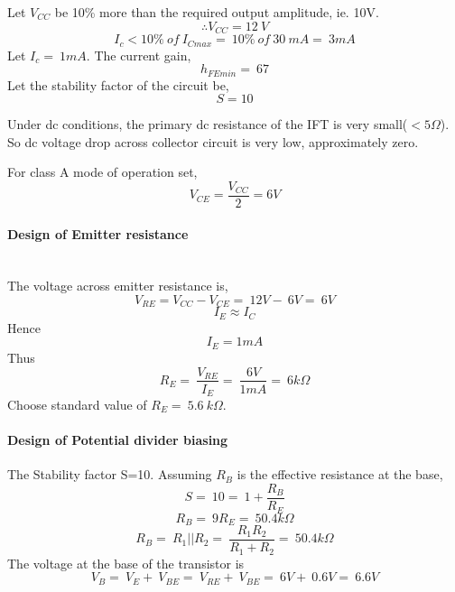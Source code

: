 \noindent Let $V_{CC}$ be 10\% more than the required output amplitude, ie. 10V.
\begin{equation}
\therefore V_{CC}=12\ V
\end{equation}
\begin{equation}
I_c<10 \% \ of \  I_{Cmax} =\ 10\%\  of\  30\  mA =\ 3 mA
\end{equation}
\noindent Let $I_c=\ 1 mA$.
\noindent The current gain,
\begin{equation}
h_{FEmin}=\ 67
\end{equation}
Let the stability factor of the circuit be,
\begin{equation}
S=10
\end{equation}

\noindent Under dc  conditions, the primary dc resistance of the IFT is very small($<5\Omega$). So dc voltage drop across collector circuit is very low, approximately zero.

\noindent For class A mode of operation set, 
\begin{equation}
 V_{CE} = \frac{V_{CC}}{2}= 6 V
\end{equation}
\paragraph{Design of Emitter resistance}
\noindent \\The voltage across emitter resistance is,
\begin{equation}
V_{RE}=V_{CC}- V_{CE} =\ 12V-\ 6V=\ 6V
\end{equation}
\begin{equation}
I_E \approx I_C 
 \end{equation}
\noindent Hence
\begin{equation}
I_E = 1mA
\end{equation}
\noindent Thus
\begin{equation}
R_E=\ \frac{V_{RE}}{I_E}=\ \frac{6V}{1mA}=\ 6k\Omega
\end{equation}
\noindent Choose standard value of $R_E=\ 5.6 \ k\Omega$.
\paragraph{Design of Potential divider biasing\\}
\noindent The Stability factor S=10. Assuming $R_B$ is the effective resistance at the base,
\begin{equation}
S=\ 10=\ 1+\frac{R_B}{R_E}
\end{equation}
\begin{equation}
R_B=\ 9R_E=\ 50.4k\Omega
\end{equation}
\begin{equation}
\label{R1R2}
R_B=\ R_1||R_2=\ \frac{R_1R_2}{R_1+R_2}=\ 50.4k\Omega
\end{equation}
\noindent The voltage at the base of the transistor is 
\begin{equation}
V_B=\ V_E+\ V_{BE}=\ V_{RE}+\ V_{BE}=\ 6V+\ 0.6V=\ 6.6 V
\end{equation}

